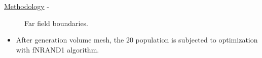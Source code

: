 \begin{frame}[allowframebreaks]{\underline{Methodology} -}
{\begin{figure}
    \caption{Far field boundaries.}
    \label{farfield}
\end{figure}
}
\begin{itemize}
\item After generation volume mesh, the 20 population is subjected to optimization with fNRAND1 algorithm.  
\end{itemize}
\end{frame}